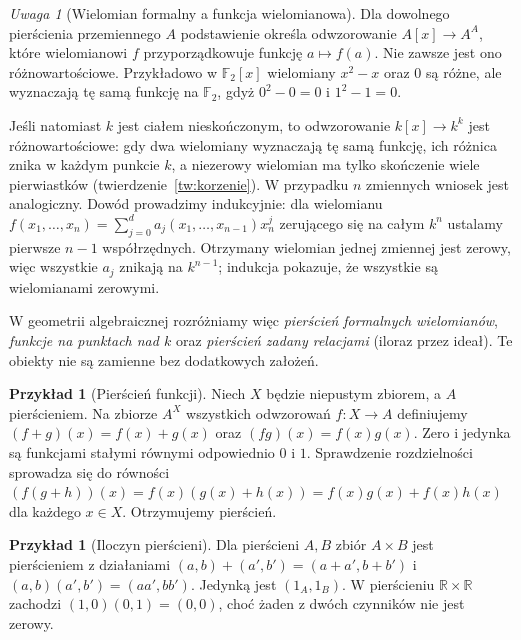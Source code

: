 \documentclass[11pt,a4paper,openany]{report}
\numberwithin{equation}{section}
\theoremstyle{plain}
\theoremstyle{definition}
\newtheorem{przyklad}[twierdzenie]{Przykład}
\theoremstyle{remark}
\newtheorem{uwaga}[twierdzenie]{Uwaga}
\newcommand{\R}{\mathbb R}
\begin{document}
\begin{uwaga}[Wielomian formalny a funkcja wielomianowa]
\label{uw:formalna-funkcja}
Dla dowolnego pierścienia przemiennego $A$ podstawienie określa
odwzorowanie $A[x]\to A^A$, które wielomianowi $f$ przyporządkowuje
funkcję $a\mapsto f(a)$. Nie zawsze jest ono różnowartościowe.
Przykładowo w $\mathbb F_2[x]$ wielomiany $x^2-x$ oraz $0$ są różne,
ale wyznaczają tę samą funkcję na $\mathbb F_2$, gdyż
$0^2-0=0$ i $1^2-1=0$.

Jeśli natomiast $k$ jest ciałem nieskończonym, to odwzorowanie
$k[x]\to k^k$ jest różnowartościowe: gdy dwa wielomiany wyznaczają tę samą
funkcję, ich różnica znika w każdym punkcie $k$, a niezerowy wielomian
ma tylko skończenie wiele pierwiastków (twierdzenie~\ref{tw:korzenie}).
W przypadku $n$ zmiennych wniosek jest analogiczny. Dowód prowadzimy
indukcyjnie: dla wielomianu
$f(x_1,\dots,x_n)=\sum_{j=0}^d a_j(x_1,\dots,x_{n-1})x_n^j$
zerującego się na całym $k^n$ ustalamy pierwsze $n-1$ współrzędnych.
Otrzymany wielomian jednej zmiennej jest zerowy, więc wszystkie
$a_j$ znikają na $k^{n-1}$; indukcja pokazuje, że wszystkie są
wielomianami zerowymi.

W geometrii algebraicznej rozróżniamy więc 
\emph{pierścień formalnych wielomianów}, 
\emph{funkcje na punktach nad $k$} oraz 
\emph{pierścień zadany relacjami} (iloraz przez ideał).
Te obiekty nie są zamienne bez dodatkowych założeń.
\end{uwaga}

\begin{przyklad}[Pierścień funkcji]
Niech $X$ będzie niepustym zbiorem, a $A$ pierścieniem.
Na zbiorze $A^X$ wszystkich odwzorowań $f\colon X\to A$ definiujemy
$(f+g)(x)=f(x)+g(x)$ oraz $(fg)(x)=f(x)g(x)$.
Zero i jedynka są funkcjami stałymi równymi odpowiednio $0$ i $1$.
Sprawdzenie rozdzielności sprowadza się do równości
$(f(g+h))(x)=f(x)(g(x)+h(x))=f(x)g(x)+f(x)h(x)$
dla każdego $x\in X$. Otrzymujemy pierścień.
\end{przyklad}

\begin{przyklad}[Iloczyn pierścieni]
Dla pierścieni $A,B$ zbiór $A\times B$ jest pierścieniem z działaniami
$(a,b)+(a',b')=(a+a',b+b')$ i
$(a,b)(a',b')=(aa',bb')$. Jedynką jest $(1_A,1_B)$.
W pierścieniu $\R\times\R$ zachodzi $(1,0)(0,1)=(0,0)$,
choć żaden z dwóch czynników nie jest zerowy.
\end{przyklad}
\end{document}
